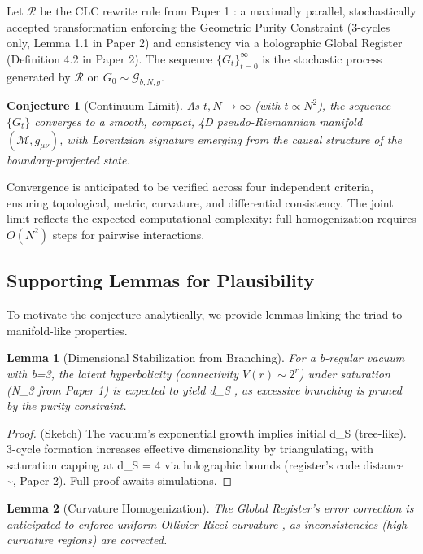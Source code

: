 \documentclass[11pt, a4paper]{article}
\newtheorem{conjecture}{Conjecture}[section]
\newtheorem{lemma}{Lemma}[section]
\begin{document}
Let \(\mathcal{R}\) be the CLC rewrite rule from Paper 1 \cite{fisher2025}: a maximally parallel, stochastically accepted transformation enforcing the Geometric Purity Constraint (3-cycles only, Lemma 1.1 in Paper 2) and consistency via a holographic Global Register (Definition 4.2 in Paper 2). The sequence \(\{G_t\}_{t=0}^\infty\) is the stochastic process generated by \(\mathcal{R}\) on \(G_0 \sim \mathcal{G}_{b,N,g}\).

\begin{conjecture}[Continuum Limit]
\label{conj:continuum}
As \(t, N \to \infty\) (with \(t \propto N^2\)), the sequence \(\{G_t\}\) converges to a smooth, compact, 4D pseudo-Riemannian manifold \((\mathcal{M}, g_{\mu\nu})\), with Lorentzian signature emerging from the causal structure of the boundary-projected state.
\end{conjecture}

Convergence is anticipated to be verified across four independent criteria, ensuring topological, metric, curvature, and differential consistency. The joint limit reflects the expected computational complexity: full homogenization requires \(O(N^2)\) steps for pairwise interactions.

\subsection{Supporting Lemmas for Plausibility}
To motivate the conjecture analytically, we provide lemmas linking the triad to manifold-like properties.

\begin{lemma}[Dimensional Stabilization from Branching]
\label{lem:dim_stab}
For a b-regular vacuum with b=3, the latent hyperbolicity (connectivity \(V(r) \sim 2^r\)) under saturation (N_3  from Paper 1) is expected to yield d_S , as excessive branching is pruned by the purity constraint.
\end{lemma}

\begin{proof}
(Sketch) The vacuum's exponential growth implies initial d_S  (tree-like). 3-cycle formation increases effective dimensionality by triangulating, with saturation capping at d_S = 4 via holographic bounds (register's code distance \sim {}, Paper 2). Full proof awaits simulations.
\end{proof}

\begin{lemma}[Curvature Homogenization]
\label{lem:curv_hom}
The Global Register's error correction is anticipated to enforce uniform Ollivier-Ricci curvature \kappa {}, as inconsistencies (high-curvature regions) are corrected.
\end{lemma}
\end{document}
